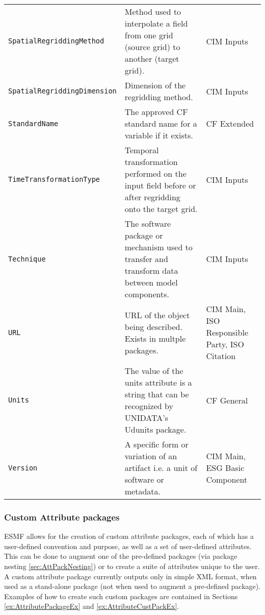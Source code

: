 \begin{longtable}{|p{7cm}|p{5cm}|p{2cm}}
     {\tt SpatialRegriddingMethod} & Method used to interpolate a field from one grid (source grid) to another (target grid). & CIM Inputs\\ 
     {\tt SpatialRegriddingDimension} & Dimension of the regridding method. & CIM Inputs\\
     {\tt StandardName} & The approved CF standard name for a variable if it exists. &  CF Extended\\
     {\tt TimeTransformationType} & Temporal transformation performed on the input field before or after regridding onto the target grid.& CIM Inputs\\ 
     {\tt Technique} & The software package or mechanism used to transfer and transform data between model components. & CIM Inputs\\ 
     {\tt URL} & URL of the object being described. Exists in multple packages. & CIM Main, ISO Responsible Party, ISO Citation\\
     {\tt Units}  & The value of the units attribute is a string that can be recognized by UNIDATA's Udunits package. & CF General\\
     {\tt Version} & A specific form or variation of an artifact i.e. a unit of software or metadata. & CIM Main, ESG Basic Component\\ 
\hline\hline
\end{longtable}

\vspace{.20in}

\subsubsection{Custom Attribute packages}
\label{sec:CustomAttPacks}

ESMF allows for the creation of custom attribute packages, each of which has a user-defined convention and purpose, as well as a set of user-defined attributes. This can be done to augment one of the pre-defined packages (via package nesting \ref{sec:AttPackNesting}) or to create a suite of attributes unique to the user. A custom attribute package currently outputs only in simple XML format, when used as a stand-alone package (not when used to augment a pre-defined package).  Examples of how to create such custom packages are contained in Sections \ref{ex:AttributePackageEx} and \ref{ex:AttributeCustPackEx}.
